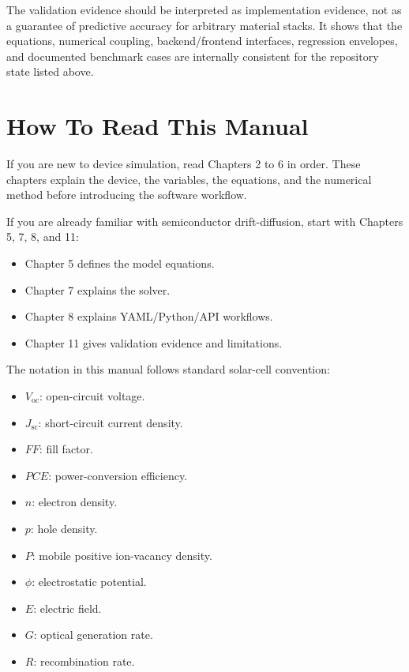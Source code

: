 \documentclass[
  11pt,
  american,
]{report}
\providecommand{\tightlist}{%
  \setlength{\itemsep}{0pt}\setlength{\parskip}{0pt}}
\begin{document}
The validation evidence should be interpreted as implementation
evidence, not as a guarantee of predictive accuracy for arbitrary
material stacks. It shows that the equations, numerical coupling,
backend/frontend interfaces, regression envelopes, and documented
benchmark cases are internally consistent for the repository state
listed above.

\hypertarget{how-to-read-this-manual}{%
\chapter{How To Read This Manual}\label{how-to-read-this-manual}}

If you are new to device simulation, read Chapters 2 to 6 in order.
These chapters explain the device, the variables, the equations, and the
numerical method before introducing the software workflow.

If you are already familiar with semiconductor drift-diffusion, start
with Chapters 5, 7, 8, and 11:

\begin{itemize}
\tightlist
\item
  Chapter 5 defines the model equations.
\item
  Chapter 7 explains the solver.
\item
  Chapter 8 explains YAML/Python/API workflows.
\item
  Chapter 11 gives validation evidence and limitations.
\end{itemize}

The notation in this manual follows standard solar-cell convention:

\begin{itemize}
\tightlist
\item
  \(V_\mathrm{oc}\): open-circuit voltage.
\item
  \(J_\mathrm{sc}\): short-circuit current density.
\item
  \(FF\): fill factor.
\item
  \(PCE\): power-conversion efficiency.
\item
  \(n\): electron density.
\item
  \(p\): hole density.
\item
  \(P\): mobile positive ion-vacancy density.
\item
  \(\phi\): electrostatic potential.
\item
  \(E\): electric field.
\item
  \(G\): optical generation rate.
\item
  \(R\): recombination rate.
\end{itemize}
\end{document}
